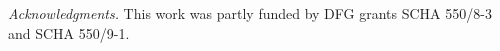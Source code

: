 \smallskip\noindent\emph{Acknowledgments.}
%
This work was partly funded 
by 
DFG grants 
SCHA 550/8-3 %
and
SCHA 550/9-1.   %

